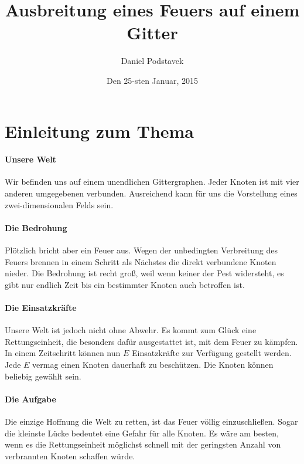 \documentclass{article}
\title{Ausbreitung eines Feuers auf einem Gitter}
\author{Daniel Podstavek}
\date {Den 25-sten Januar, 2015}
\begin{document}
	\maketitle

	\section{Einleitung zum Thema}
	
	\paragraph{Unsere Welt}
	
	Wir befinden uns auf einem unendlichen Gittergraphen. Jeder Knoten ist mit vier anderen umgegebenen verbunden. Ausreichend kann für uns die Vorstellung eines zwei-dimensionalen Felds sein.
	
	 \paragraph{Die Bedrohung}
	 
	  Plötzlich bricht aber ein Feuer aus. Wegen der unbedingten Verbreitung des Feuers brennen in einem Schritt als Nächstes die direkt verbundene Knoten nieder. Die Bedrohung ist recht groß, weil wenn keiner der Pest widersteht, es gibt nur endlich Zeit bis ein bestimmter Knoten auch betroffen ist.
	  
	  \paragraph{Die Einsatzkräfte}
	  
	  Unsere Welt ist jedoch nicht ohne Abwehr. Es kommt zum Glück eine Rettungseinheit, die besonders dafür ausgestattet ist, mit dem Feuer zu kämpfen. In einem Zeitschritt können nun $E$ Einsatzkräfte zur Verfügung gestellt werden. Jede $E$ vermag einen Knoten dauerhaft zu beschützen. Die Knoten können beliebig gewählt sein.
	  
	  \paragraph{Die Aufgabe}
	  
	  Die einzige Hoffnung die Welt zu retten, ist das Feuer völlig einzuschließen. Sogar die kleinste Lücke bedeutet eine Gefahr für alle Knoten.  Es wäre am besten, wenn es die Rettungseinheit möglichst schnell mit der geringsten Anzahl von verbrannten Knoten schaffen würde.
	  
\end{document}
